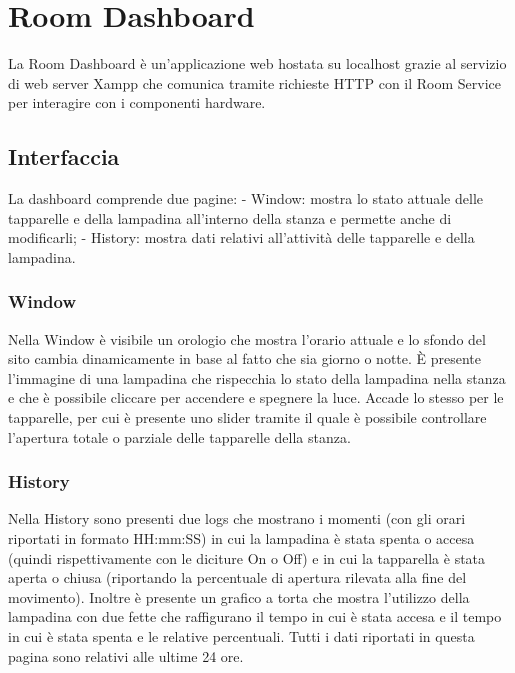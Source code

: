 \documentclass[12pt]{article}
\begin{document}
\section{Room Dashboard}

La Room Dashboard è un'applicazione web hostata su localhost grazie al servizio di web server Xampp che comunica tramite richieste HTTP con il Room Service per interagire con i componenti hardware.

\subsection{Interfaccia}

La dashboard comprende due pagine:
\newline
- Window: mostra lo stato attuale delle tapparelle e della lampadina all'interno della stanza e permette anche di modificarli;
\newline
- History: mostra dati relativi all'attività delle tapparelle e della lampadina.

\subsubsection{Window}
Nella Window è visibile un orologio che mostra l'orario attuale e lo sfondo del sito cambia dinamicamente in base al fatto che sia giorno o notte. È presente l'immagine di una lampadina che rispecchia lo stato della lampadina nella stanza e che è possibile cliccare per accendere e spegnere la luce. Accade lo stesso per le tapparelle, per cui è presente uno slider tramite il quale è possibile controllare l'apertura totale o parziale delle tapparelle della stanza.

\subsubsection{History}
Nella History sono presenti due logs che mostrano i momenti (con gli orari riportati in formato HH:mm:SS) in cui la lampadina è stata spenta o accesa (quindi rispettivamente con le diciture On o Off) e in cui la tapparella è stata aperta o chiusa (riportando la percentuale di apertura rilevata alla fine del movimento). \newline
Inoltre è presente un grafico a torta che mostra l'utilizzo della lampadina con due fette che raffigurano il tempo in cui è stata accesa e il tempo in cui è stata spenta e le relative percentuali. \newline
Tutti i dati riportati in questa pagina sono relativi alle ultime 24 ore.
\end{document}
